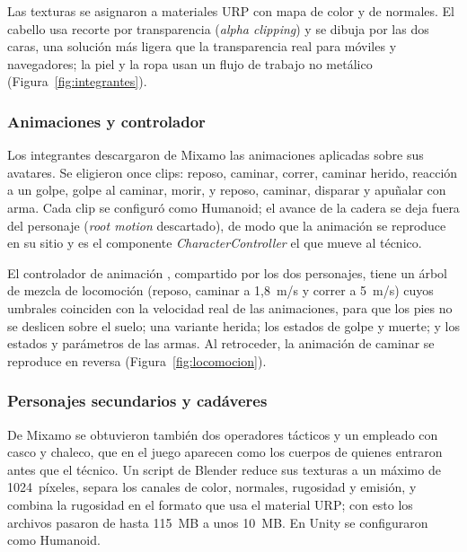 Las texturas se asignaron a materiales URP con mapa de color y de normales. El cabello usa recorte
por transparencia (\textit{alpha clipping}) y se dibuja por las dos caras, una solución más ligera
que la transparencia real para móviles y navegadores; la piel y la ropa usan un flujo de trabajo no
metálico (Figura~\ref{fig:integrantes}).


\subsubsection{Animaciones y controlador}

Los integrantes descargaron de Mixamo \parencite{mixamo2026} las animaciones aplicadas sobre sus
avatares. Se eligieron once clips: reposo, caminar, correr, caminar herido, reacción a un golpe,
golpe al caminar, morir, y reposo, caminar, disparar y apuñalar con arma. Cada clip se configuró
como Humanoid; el avance de la cadera se deja fuera del personaje (\textit{root motion}
descartado), de modo que la animación se reproduce en su sitio y es el componente
\textit{CharacterController} el que mueve al técnico.

El controlador de animación , compartido por los dos personajes, tiene un árbol de
mezcla de locomoción (reposo, caminar a 1,8~m/s y correr a 5~m/s) cuyos umbrales coinciden con la
velocidad real de las animaciones, para que los pies no se deslicen sobre el suelo; una variante
herida; los estados de golpe y muerte; y los estados y parámetros de las armas. Al retroceder, la
animación de caminar se reproduce en reversa (Figura~\ref{fig:locomocion}).


\subsubsection{Personajes secundarios y cadáveres}

De Mixamo se obtuvieron también dos operadores tácticos y un empleado con casco y chaleco, que en
el juego aparecen como los cuerpos de quienes entraron antes que el técnico. Un script de Blender
reduce sus texturas a un máximo de 1024~píxeles, separa los canales de color, normales, rugosidad y
emisión, y combina la rugosidad en el formato que usa el material URP; con esto los archivos pasaron
de hasta 115~MB a unos 10~MB. En Unity se configuraron como Humanoid.

